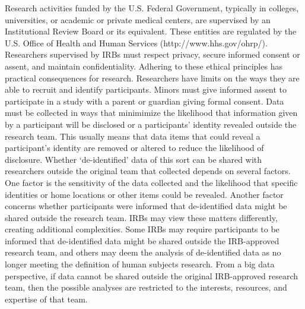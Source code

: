 \documentclass[letterpaper,man,apacite]{apa6}
\begin{document}
Research activities funded by the U.S. Federal Government, typically in colleges, universities, or academic or private medical centers, are supervised by an Institutional Review Board or its equivalent.
These entities are regulated by the U.S. Office of Health and Human Services (http://www.hhs.gov/ohrp/).
Researchers supervised by IRBs must respect privacy, secure informed consent or assent, and maintain confidentiality. 
Adhering to these ethical principles has practical consequences for research.
Researchers have limits on the ways they are able to recruit and identify participants.
Minors must give informed assent to participate in a study with a parent or guardian giving formal consent.
Data must be collected in ways that minimimize the likelihood that information given by a participant will be disclosed or a participants' identity revealed outside the research team.
This usually means that data items that could reveal a participant's identity are removed or altered to reduce the likelihood of disclosure.
Whether `de-identified' data of this sort can be shared with researchers outside the original team that collected depends on several factors.
One factor is the sensitivity of the data collected and the likelihood that specific identities or home locations or other items could be revealed.
Another factor concerns whether participants were informed that de-identified data might be shared outside the research team.
IRBs may view these matters differently, creating additional complexities.
Some IRBs may require participants to be informed that de-identified data might be shared outside the IRB-approved research team, and others may deem the analysis of de-identified data as no longer meeting the definition of human subjects research.
From a big data perspective, if data cannot be shared outside the original IRB-approved research team, then the possible analyses are restricted to the interests, resources, and expertise of that team.
\end{document}
